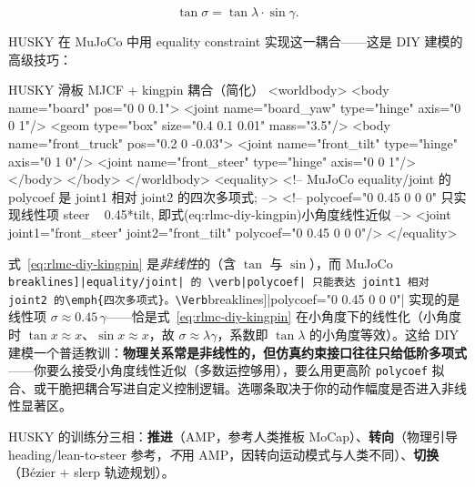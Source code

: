 \begin{equation}
\tan\sigma = \tan\lambda \cdot \sin\gamma.
\label{eq:rlmc-diy-kingpin}
\end{equation}

HUSKY 在 MuJoCo 中用 equality constraint 实现这一耦合——这是 DIY 建模的高级技巧：

\begin{codebox}[text]{HUSKY 滑板 MJCF + kingpin 耦合（简化）}
<worldbody>
  <body name="board" pos="0 0 0.1">
    <joint name="board_yaw" type="hinge" axis="0 0 1"/>
    <geom type="box" size="0.4 0.1 0.01" mass="3.5"/>
    <body name="front_truck" pos="0.2 0 -0.03">
      <joint name="front_tilt"  type="hinge" axis="0 1 0"/>
      <joint name="front_steer" type="hinge" axis="0 0 1"/>
    </body>
  </body>
</worldbody>
<equality>
  <!-- MuJoCo equality/joint 的 polycoef 是 joint1 相对 joint2 的四次多项式; -->
  <!-- polycoef="0 0.45 0 0 0" 只实现线性项 steer ~ 0.45*tilt, 即式(eq:rlmc-diy-kingpin)小角度线性近似 -->
  <joint joint1="front_steer" joint2="front_tilt" polycoef="0 0.45 0 0 0"/>
</equality>
\end{codebox}

\begin{insight}\label{ins:rlmc-diy-husky-approx}
式~\eqref{eq:rlmc-diy-kingpin} 是\emph{非线性}的（含 $\tan$ 与 $\sin$），而 MuJoCo \Verb[breaklines]|equality/joint| 的 \verb|polycoef| 只能表达 joint1 相对 joint2 的\emph{四次多项式}。\Verb[breaklines]|polycoef="0 0.45 0 0 0"| 实现的是线性项 $\sigma\approx 0.45\,\gamma$——恰是式~\eqref{eq:rlmc-diy-kingpin} 在小角度下的线性化（小角度时 $\tan x\approx x$、$\sin x\approx x$，故 $\sigma\approx \lambda\gamma$，系数即 $\tan\lambda$ 的小角度等效）。这给 DIY 建模一个普适教训：\textbf{物理关系常是非线性的，但仿真约束接口往往只给低阶多项式}——你要么接受小角度线性近似（多数运控够用），要么用更高阶 \verb|polycoef| 拟合、或干脆把耦合写进自定义控制逻辑。选哪条取决于你的动作幅度是否进入非线性显著区。
\end{insight}

HUSKY 的训练分三相：\textbf{推进}（AMP，参考人类推板 MoCap）、\textbf{转向}（物理引导 heading/lean-to-steer 参考，\emph{不}用 AMP，因转向运动模式与人类不同）、\textbf{切换}（Bézier + slerp 轨迹规划）。

